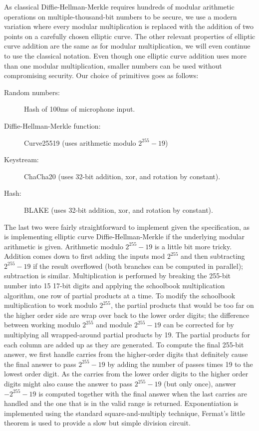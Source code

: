 \documentclass[a4paper]{report}
\begin{document}
As classical Diffie-Hellman-Merkle requires hundreds of modular arithmetic operations
on multiple-thousand-bit numbers to be secure, we use a modern
variation where every modular multiplication is replaced with the addition of
two points on a carefully chosen elliptic curve. The other relevant properties
of elliptic curve addition are the same as for modular multiplication, we will %
even continue to use the classical notation. Even though one elliptic curve
addition uses more than one modular multiplication, smaller numbers can be used
without compromising security. Our choice of primitives goes as follows:

\begin{description}
  \item[Random numbers:] Hash of 100ms of microphone input.
  \item[Diffie-Hellman-Merkle function:] Curve25519 (uses arithmetic modulo $2^{255}-19$)
  \item[Keystream:] ChaCha20 (uses 32-bit addition, xor, and rotation by constant).
  \item[Hash:] BLAKE (uses 32-bit addition, xor, and rotation by constant).
\end{description}

The last two were fairly straightforward to implement given the specification, as
is implementing elliptic curve Diffie-Hellman-Merkle if the underlying modular
arithmetic is given. Arithmetic modulo $2^{255}-19$ is a little bit more
tricky. Addition comes down to first adding the inputs mod $2^{255}$ and then
subtracting $2^{255}-19$ if the result overflowed (both branches can be computed
in parallel); subtraction is similar.  Multiplication is performed by breaking
the 255-bit number into 15 17-bit digits and applying the schoolbook
multiplication algorithm, one row of partial products at a time. To modify the
schoolbook multiplication to work modulo $2^{255}$, the partial products that
would be too far on the higher order side are wrap over back to the lower order
digits; the difference between working modulo $2^{255}$ and module $2^{255}-19$
can be corrected for by multiplying all wrapped-around partial products by 19.
The partial products for each column are added up as they are generated. To
compute the final 255-bit answer, we first handle carries from the higher-order
digits that definitely cause the final answer to pass $2^{255}-19$ by adding the
number of passes times 19 to the lowest order digit. As the carries from the
lower order digits to the higher order digits might also cause the answer to
pass $2^{255}-19$ (but only once), answer$-2^{255}-19$ is computed together with
the final answer when the last carries are handled and the one that is in the
valid range is returned. Exponentiation is implemented using the standard
square-and-multiply technique, Fermat's little theorem is used to provide a slow
but simple division circuit.
\end{document}
